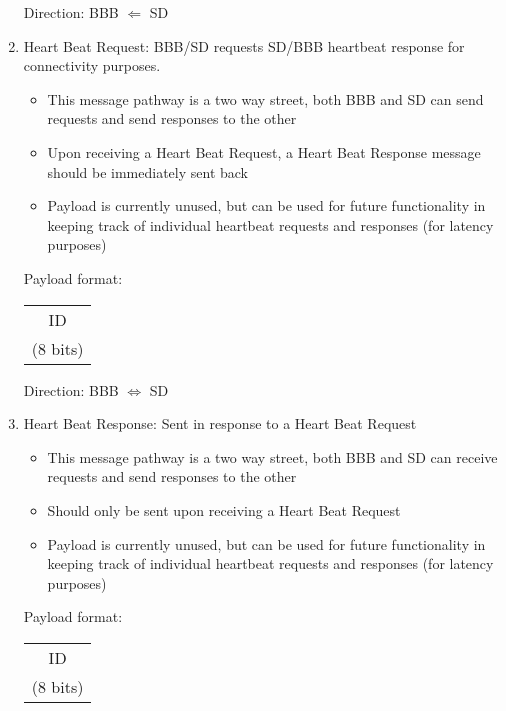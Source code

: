 \documentclass[12pt]{book}
\begin{document}
\begin{enumerate}
        Direction: BBB $\Leftarrow$ SD
    \item Heart Beat Request: BBB/SD requests SD/BBB heartbeat response for
        connectivity purposes.
        \begin{itemize}
            \item This message pathway is a two way street, both BBB and SD can send
                requests and send responses to the other
            \item Upon receiving a Heart Beat Request, a Heart Beat Response message
                should be immediately sent back
            \item Payload is currently unused, but can be used for future
                functionality in keeping track of individual heartbeat requests and
                responses (for latency purposes)
        \end{itemize}
        Payload format:
        \begin{center}
            \begin{tabular}{|c|}
                \hline
                ID \\
                (8 bits) \\
                \hline
            \end{tabular}
        \end{center}
        Direction: BBB $\Leftrightarrow$ SD
    \item Heart Beat Response: Sent in response to a Heart Beat Request
        \begin{itemize}
            \item This message pathway is a two way street, both BBB and SD can
                receive requests and send responses to the other
            \item Should only be sent upon receiving a Heart Beat Request
            \item Payload is currently unused, but can be used for future
                functionality in keeping track of individual heartbeat requests and
                responses (for latency purposes)
        \end{itemize}
        Payload format:
        \begin{center}
            \begin{tabular}{|c|}
                \hline
                ID \\
                (8 bits) \\
                \hline
            \end{tabular}

\end{center}
\end{enumerate}
\end{document}
